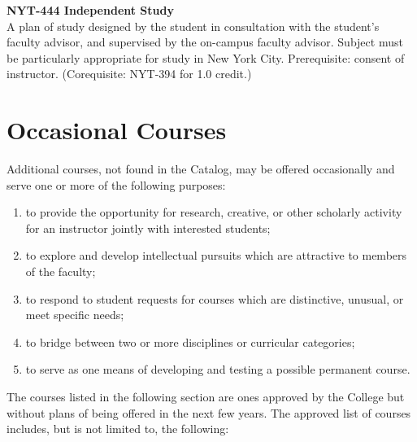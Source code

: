 \documentclass[
  letterpaper,
]{scrbook}
\providecommand{\tightlist}{%
  \setlength{\itemsep}{0pt}\setlength{\parskip}{0pt}}
\begin{document}
\textbf{NYT-444 Independent Study}\\
A plan of study designed by the student in consultation with the
student's faculty advisor, and supervised by the on-campus faculty
advisor. Subject must be particularly appropriate for study in New York
City. Prerequisite: consent of instructor. (Corequisite: NYT-394 for 1.0
credit.)

\section{Occasional Courses}\label{occasional-courses}

Additional courses, not found in the Catalog, may be offered
occasionally and serve one or more of the following purposes:

\begin{enumerate}
\def\labelenumi{\arabic{enumi}.}
\tightlist
\item
  to provide the opportunity for research, creative, or other scholarly
  activity for an instructor jointly with interested students;
\item
  to explore and develop intellectual pursuits which are attractive to
  members of the faculty;
\item
  to respond to student requests for courses which are distinctive,
  unusual, or meet specific needs;
\item
  to bridge between two or more disciplines or curricular categories;
\item
  to serve as one means of developing and testing a possible permanent
  course.
\end{enumerate}

The courses listed in the following section are ones approved by the
College but without plans of being offered in the next few years. The
approved list of courses includes, but is not limited to, the following:
\end{document}

